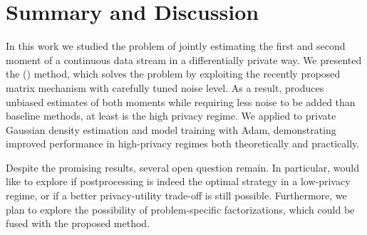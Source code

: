 \section{Summary and Discussion}
In this work we studied the problem of jointly estimating the first and second moment of a continuous data stream in a differentially private way.
%
We presented the \method (\acronym) method, which solves the problem 
by exploiting the recently proposed matrix mechanism with carefully 
tuned noise level. 
%
As a result, \acronym produces unbiased estimates of both moments
while requiring less noise to be added than baseline methods, at 
least is the high privacy regime. 
%
We applied \acronym to private Gaussian density estimation and model 
training with Adam, demonstrating improved performance in high-privacy 
regimes both theoretically and practically. 

Despite the promising results, several open question remain. 
%
In particular, would like to explore if postprocessing is indeed 
the optimal strategy in a low-privacy regime, or if a better 
privacy-utility trade-off is still possible.
%
Furthermore, we plan to explore the possibility of problem-specific 
factorizations, which could be fused with the proposed method. 
